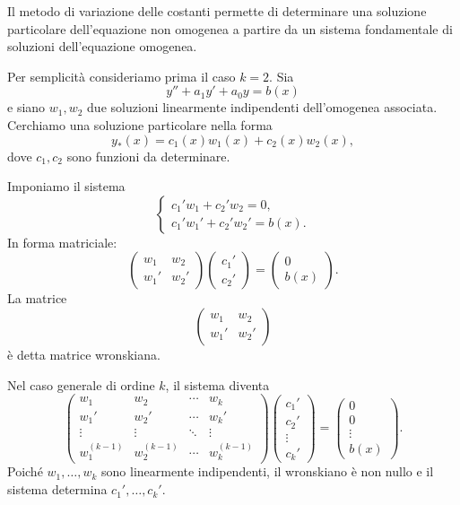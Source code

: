 \documentclass[a4paper]{article}
\begin{document}
\begin{radioactive}
Il metodo di variazione delle costanti permette di determinare una soluzione particolare dell'equazione non omogenea a partire da un sistema fondamentale di soluzioni dell'equazione omogenea.

Per semplicità consideriamo prima il caso \(k=2\). Sia
\[
    y''+a_1y'+a_0y=b(x)
\]
e siano \(w_1,w_2\) due soluzioni linearmente indipendenti dell'omogenea associata. Cerchiamo una soluzione particolare nella forma
\[
    y_\ast(x)=c_1(x)w_1(x)+c_2(x)w_2(x),
\]
dove \(c_1,c_2\) sono funzioni da determinare.

Imponiamo il sistema
\[
    \begin{cases}
        c_1'w_1+c_2'w_2=0,\\
        c_1'w_1'+c_2'w_2'=b(x).
    \end{cases}
\]
In forma matriciale:
\[
    \begin{pmatrix}
        w_1 & w_2\\
        w_1' & w_2'
    \end{pmatrix}
    \begin{pmatrix}
        c_1'\\
        c_2'
    \end{pmatrix}
    =
    \begin{pmatrix}
        0\\
        b(x)
    \end{pmatrix}.
\]
La matrice
\[
    \begin{pmatrix}
        w_1 & w_2\\
        w_1' & w_2'
    \end{pmatrix}
\]
è detta matrice wronskiana.

Nel caso generale di ordine \(k\), il sistema diventa
\[
    \begin{pmatrix}
        w_1 & w_2 & \cdots & w_k\\
        w_1' & w_2' & \cdots & w_k'\\
        \vdots & \vdots & \ddots & \vdots\\
        w_1^{(k-1)} & w_2^{(k-1)} & \cdots & w_k^{(k-1)}
    \end{pmatrix}
    \begin{pmatrix}
        c_1'\\
        c_2'\\
        \vdots\\
        c_k'
    \end{pmatrix}
    =
    \begin{pmatrix}
        0\\
        0\\
        \vdots\\
        b(x)
    \end{pmatrix}.
\]
Poiché \(w_1,\ldots,w_k\) sono linearmente indipendenti, il wronskiano è non nullo e il sistema determina \(c_1',\ldots,c_k'\).


\end{radioactive}
\end{document}
